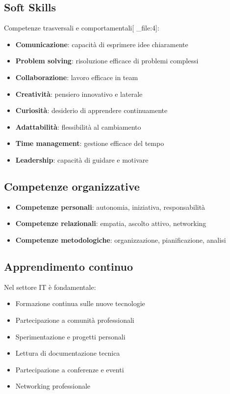 \documentclass[12pt,a4paper]{article}
\begin{document}
\subsection{Soft Skills}
Competenze trasversali e comportamentali[ _file:4]:
\begin{itemize}
    \item \textbf{Comunicazione}: capacità di esprimere idee chiaramente
    \item \textbf{Problem solving}: risoluzione efficace di problemi complessi
    \item \textbf{Collaborazione}: lavoro efficace in team
    \item \textbf{Creatività}: pensiero innovativo e laterale
    \item \textbf{Curiosità}: desiderio di apprendere continuamente
    \item \textbf{Adattabilità}: flessibilità al cambiamento
    \item \textbf{Time management}: gestione efficace del tempo
    \item \textbf{Leadership}: capacità di guidare e motivare
\end{itemize}

\subsection{Competenze organizzative}
\begin{itemize}
    \item \textbf{Competenze personali}: autonomia, iniziativa, responsabilità
    \item \textbf{Competenze relazionali}: empatia, ascolto attivo, networking
    \item \textbf{Competenze metodologiche}: organizzazione, pianificazione, analisi
\end{itemize}

\subsection{Apprendimento continuo}
Nel settore IT è fondamentale:
\begin{itemize}
    \item Formazione continua sulle nuove tecnologie
    \item Partecipazione a comunità professionali
    \item Sperimentazione e progetti personali
    \item Lettura di documentazione tecnica
    \item Partecipazione a conferenze e eventi
    \item Networking professionale
\end{itemize}
\end{document}
